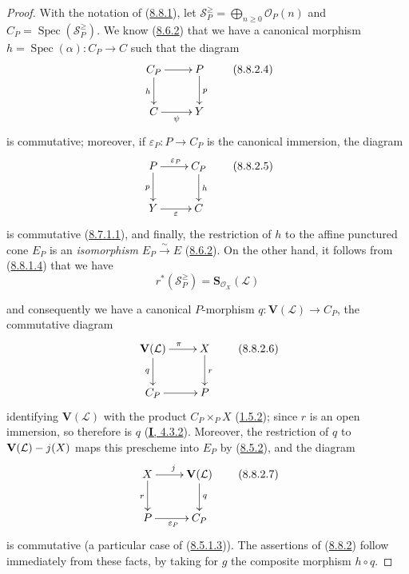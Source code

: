 \begin{proof}
With the notation of (\hyperref[II.8.8.1]{8.8.1}), let
$\mathcal{S}_P^{\geqslant}=\bigoplus_{n\geqslant 0}\mathcal{O}_P(n)$ and
$C_P=\operatorname{Spec}(\mathcal{S}_P^{\geqslant})$. We know
(\hyperref[II.8.6.2]{8.6.2}) that we have a canonical morphism
$h=\operatorname{Spec}(\alpha):C_P\to C$ such that the diagram
\begin{equation}
\label{II.8.8.2.4}
  \xymatrix{
    C_P\ar[r]\ar[d]_{h} & P\ar[d]^{p}\\
    C\ar[r]_{\psi} & Y
  }
\tag{8.8.2.4}
\end{equation}
is commutative; moreover, if $\varepsilon_P:P\to C_P$ is the canonical
immersion, the diagram
\begin{equation}
\label{II.8.8.2.5}
  \xymatrix{
    P\ar[r]^{\varepsilon_P}\ar[d]_{p} & C_P\ar[d]^{h}\\
    Y\ar[r]_{\varepsilon} & C
  }
\tag{8.8.2.5}
\end{equation}
is commutative (\hyperref[II.8.7.1.1]{8.7.1.1}), and finally, the
restriction of $h$ to the affine punctured cone $E_P$ is an
\emph{isomorphism} $E_P\xrightarrow{\sim}E$ (\hyperref[II.8.6.2]{8.6.2}).
On the other hand, it follows from (\hyperref[II.8.8.1.4]{8.8.1.4}) that
we have
\[
  r^*(\mathcal{S}_P^{\geqslant})=
  \mathbf{S}_{\mathcal{O}_X}(\mathcal{L})
\]

and consequently we have a canonical $P$-morphism
$q:\mathbf{V}(\mathcal{L})\to C_P$, the commutative diagram
\begin{equation}
\label{II.8.8.2.6}
  \xymatrix{
    \mathbf{V}(\mathcal{L})\ar[r]^{\pi}\ar[d]_{q} & X\ar[d]^{r}\\
    C_P\ar[r] & P
  }
\tag{8.8.2.6}
\end{equation}
identifying $\mathbf{V}(\mathcal{L})$ with the product $C_P\times_P X$
(\hyperref[II.1.5.2]{1.5.2}); since $r$ is an open immersion, so
therefore is $q$ (\hyperref[I.4.3.2]{\textbf{I}, 4.3.2}). Moreover, the
restriction of $q$ to $\mathbf{V}(\mathcal{L})- j(X)$ maps this prescheme into
$E_P$ by (\hyperref[II.8.5.2]{8.5.2}), and the diagram
\begin{equation}
\label{II.8.8.2.7}
  \xymatrix{
    X\ar[r]^{j}\ar[d]_{r} & \mathbf{V}(\mathcal{L})\ar[d]^{q}\\
    P\ar[r]_{\varepsilon_P} & C_P
  }
\tag{8.8.2.7}
\end{equation}
is commutative (a particular case of
(\hyperref[II.8.5.1.3]{8.5.1.3})). The assertions of
(\hyperref[II.8.8.2]{8.8.2}) follow immediately from these facts, by
taking for $g$ the composite morphism $h\circ q$.
\end{proof}

